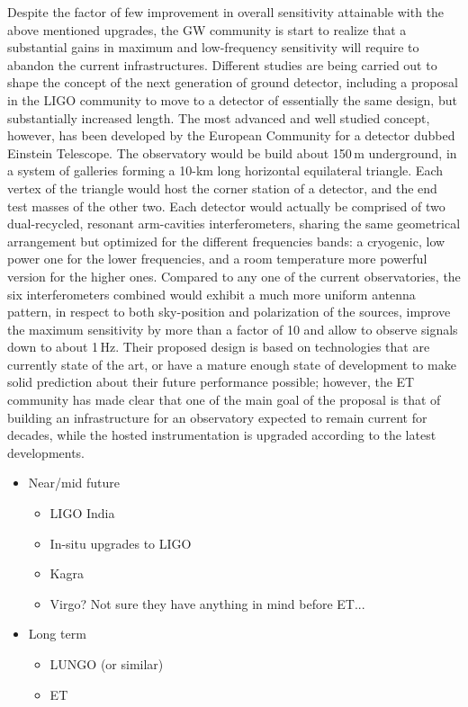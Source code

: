 Despite the factor of few improvement in overall sensitivity attainable with the above mentioned upgrades, the GW community is start to realize that a substantial gains in maximum and low-frequency sensitivity will require to abandon the current infrastructures. Different studies are being carried out to shape the concept of the next generation of ground detector, including a proposal in the LIGO community to move to a detector of essentially the same design, but substantially increased length. The most advanced and well studied concept, however, has been developed by the European Community for a detector dubbed Einstein Telescope.
The observatory would be build about 150\,m underground, in a system of galleries forming a 10-km long horizontal equilateral triangle. Each vertex of the triangle would host the corner station of a detector, and the end test masses of the other two. Each detector would actually be comprised of two dual-recycled, resonant arm-cavities interferometers, sharing the same geometrical arrangement but optimized for the different frequencies bands: a cryogenic, low power one for the lower frequencies, and a room temperature more powerful version for the higher ones.
Compared to any one of the current observatories, the six interferometers combined would exhibit a much more uniform antenna pattern, in respect to both sky-position and polarization of the sources, improve the maximum sensitivity by more than a factor of 10 and allow to observe signals down to about 1\,Hz. Their proposed design is based on technologies that are currently state of the art, or have a mature enough state of development to make solid prediction about their future performance possible; however, the ET community has made clear that one of the main goal of the proposal is that of building an infrastructure for an observatory expected to remain current for decades, while the hosted instrumentation is upgraded according to the latest developments.


\begin{itemize}
	\item Near/mid future
	\begin{itemize}
		\item LIGO India
		\item In-situ upgrades to LIGO
		\item Kagra
		\item Virgo? Not sure they have anything in mind before ET...
	\end{itemize}
	\item Long term
	\begin{itemize}
		\item LUNGO (or similar)
		\item ET
	\end{itemize}
\end{itemize}
